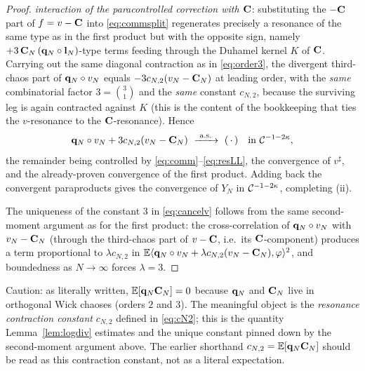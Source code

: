\begin{proof}
\emph{interaction of the paracontrolled correction with $\mathbf{C}$}: substituting the
$-\mathbf{C}$ part of $f=v-\mathbf{C}$ into \eqref{eq:commsplit} regenerates precisely a
resonance of the same type as in the first product but with the opposite sign,
namely $+3\,\mathbf{C}_N\,(\mathbf{q}_N\circ\mathbf{l}_N)$-type terms feeding through the Duhamel
kernel $K$ of $\mathbf{C}$. Carrying out the same diagonal contraction as in
\eqref{eq:order3}, the divergent third-chaos part of $\mathbf{q}_N\circ v_N$ equals
$-3c_{N,2}(v_N-\mathbf{C}_N)$ at leading order, with the \emph{same} combinatorial
factor $3=\binom31$ and the \emph{same} constant $c_{N,2}$, because the surviving
leg is again contracted against $K$ (this is the content of the bookkeeping that
ties the $v$-resonance to the $\mathbf{C}$-resonance). Hence
\begin{equation}\label{eq:cancelv}
\qoneLsq_N\circ v_N+3c_{N,2}(v_N-\qoneIqc_N)\ \xrightarrow{\ \mathrm{a.s.}\ }\ (\,\cdot\,)\quad\text{in }\qoneC^{-1-2\kappa},
\end{equation}
the remainder being controlled by \eqref{eq:comm}--\eqref{eq:resLL}, the
convergence of $v^\sharp$, and the already-proven convergence of the first product.
Adding back the convergent paraproducts gives the convergence of $Y_N$ in
$\mathcal{C}^{-1-2\kappa}$, completing (ii).

The uniqueness of the constant $3$ in \eqref{eq:cancelv} follows from the same
second-moment argument as for the first product: the cross-correlation of
$\mathbf{q}_N\circ v_N$ with $v_N-\mathbf{C}_N$ (through the third-chaos part of $v-\mathbf{C}$,
i.e.\ its $\mathbf{C}$-component) produces a term proportional to $\lambda c_{N,2}$ in
$\mathbb{E}\langle\mathbf{q}_N\circ v_N+\lambda c_{N,2}(v_N-\mathbf{C}_N),\varphi\rangle^2$, and
boundedness as $N\to\infty$ forces $\lambda=3$.
\end{proof}

\begin{remark}\label{rem:cN2zero}
Caution: as literally written, $\mathbb{E}[\mathbf{q}_N\mathbf{C}_N]=0$ because $\mathbf{q}_N$ and
$\mathbf{C}_N$ live in orthogonal Wick chaoses (orders $2$ and $3$). The meaningful
object is the \emph{resonance contraction constant} $c_{N,2}$ defined in
\eqref{eq:cN2}; this is the quantity Lemma~\ref{lem:logdiv} estimates and the
unique constant pinned down by the second-moment argument above. The earlier
shorthand $c_{N,2}=\mathbb{E}[\mathbf{q}_N\mathbf{C}_N]$ should be read as this contraction
constant, not as a literal expectation.
\end{remark}

